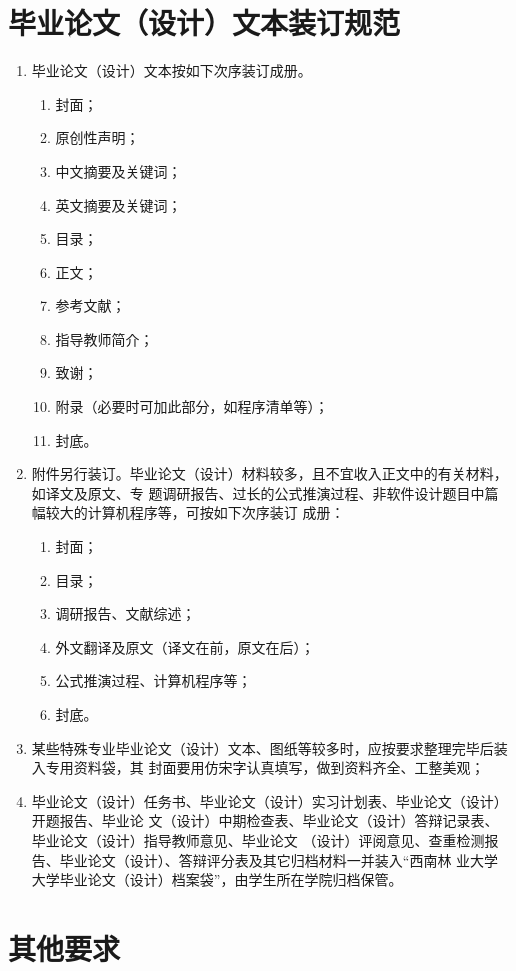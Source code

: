 \documentclass{swfuthesis}
\begin{document}
\section{毕业论文（设计）文本装订规范}

\begin{enumerate}
\item 毕业论文（设计）文本按如下次序装订成册。
  \begin{enumerate}
  \item 封面；
  \item 原创性声明；
  \item 中文摘要及关键词；
  \item 英文摘要及关键词；
  \item 目录；
  \item 正文；
  \item 参考文献；
  \item 指导教师简介；
  \item 致谢；
  \item 附录（必要时可加此部分，如程序清单等）；
  \item 封底。
  \end{enumerate}
\item 附件另行装订。毕业论文（设计）材料较多，且不宜收入正文中的有关材料，如译文及原文、专
  题调研报告、过长的公式推演过程、非软件设计题目中篇幅较大的计算机程序等，可按如下次序装订
  成册：
  \begin{enumerate}
  \item 封面；
  \item 目录；
  \item 调研报告、文献综述；
  \item 外文翻译及原文（译文在前，原文在后）；
  \item 公式推演过程、计算机程序等；
  \item 封底。
  \end{enumerate}
\item 某些特殊专业毕业论文（设计）文本、图纸等较多时，应按要求整理完毕后装入专用资料袋，其
  封面要用仿宋字认真填写，做到资料齐全、工整美观；
\item 毕业论文（设计）任务书、毕业论文（设计）实习计划表、毕业论文（设计）开题报告、毕业论
  文（设计）中期检查表、毕业论文（设计）答辩记录表、毕业论文（设计）指导教师意见、毕业论文
  （设计）评阅意见、查重检测报告、毕业论文（设计）、答辩评分表及其它归档材料一并装入“西南林
  业大学大学毕业论文（设计）档案袋”，由学生所在学院归档保管。
\end{enumerate}

\section{其他要求}
\end{document}
